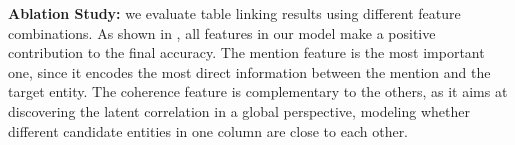 \noindent
\textbf{Ablation Study:}
we evaluate table linking results using different feature combinations.
As shown in ,
all features in our model make a positive contribution to the final accuracy.
The mention feature is the most important one, since it encodes
the most direct information between the mention and the target entity.
The coherence feature is complementary to the others,
as it aims at discovering the latent correlation in a global perspective, 
modeling whether different candidate entities in one column 
are close to each other.
